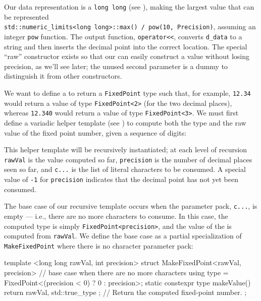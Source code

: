 \noindent Our data representation is a \lstinline!long!~\lstinline!long! (see ), making the
largest value that can be represented
\lstinline!std::numeric_limits<long!~\lstinline!long>::max()!~\lstinline!/!~\lstinline!pow(10,!~\lstinline!Precision)!, assuming an integer \lstinline!pow! function. The output function,
\lstinline!operator<<!, converts \lstinline!d_data! to a string and
then inserts the decimal point into the correct location. The special
``raw'' constructor exists so that our  can easily
construct a value without losing precision, as we'll see later; the
unused second parameter is a dummy to distinguish it from other
constructors.

We want to define a  to return a
\lstinline!FixedPoint! type such that, for example, \lstinline!12.34! would
return a value of type \lstinline!FixedPoint<2>! (for the two decimal
places), whereas \lstinline!12.340! would return a value of type
\lstinline!FixedPoint<3>!. We must first define a variadic helper template (see ) to
compute both the type and the raw value of the fixed point number, given a
sequence of digits:

\begin{emcppslisting}[emcppsbatch=e17]
namespace literals  // fixed-point literals defined in this namespace
{

template <long long rawVal, int precision, char... c>
struct MakeFixedPoint;
\end{emcppslisting}

\noindent This helper template will be recursively instantiated; at each level of
recursion \lstinline!rawVal! is the value computed so far,
\lstinline!precision! is the number of decimal places seen so far, and
\lstinline!c...! is the list of literal characters to be consumed. A
special value of \lstinline!-1! for \lstinline!precision! indicates that the decimal
point has not yet been consumed.

The base case of our recursive template occurs when the parameter pack,
\lstinline!c...!, is empty --- i.e., there are no more characters to
consume. In this case, the computed type is simply
\lstinline!FixedPoint<precision>!, and the value of the  is computed from \lstinline!rawVal!. We define the base case as a
partial specialization of \lstinline!MakeFixedPoint! where there is no
character parameter pack:

\begin{emcppslisting}[emcppsbatch=e17]
template <long long rawVal, int precision>
struct MakeFixedPoint<rawVal, precision>
{
    // base case when there are no more characters
    using type = FixedPoint<(precision < 0) ? 0 : precision>;
    static constexpr type makeValue() { return { rawVal, std::true_type{} }; }
        // Return the computed fixed-point number.
};
\end{emcppslisting}

